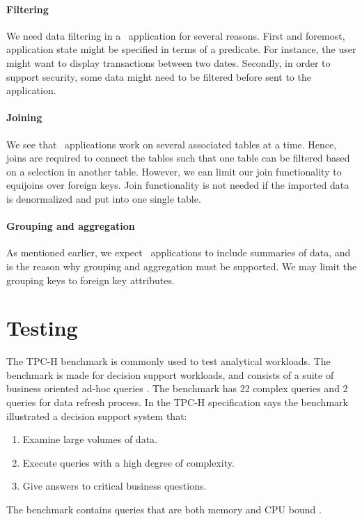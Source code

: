 \paragraph{Filtering}
We need data filtering in a \bd~application for several reasons. First and foremost, application state might be specified in terms of a predicate. For instance, the user might want to display transactions between two dates. Secondly, in order to support security, some data might need to be filtered before sent to the application.

\paragraph{Joining}
We see that \bd~applications work on several associated tables at a time. Hence, joins are required to connect the tables such that one table can be filtered based on a selection in another table. However, we can limit our join functionality to equijoins over foreign keys. Join functionality is not needed if the imported data is denormalized and put into one single table.

\paragraph{Grouping and aggregation}
\label{par:Grouping and aggregation}
As mentioned earlier, we expect \bd~applications to include summaries of data, and is the reason why grouping and aggregation must be supported. We may limit the grouping keys to foreign key attributes.

\section{Testing}
\label{sec:Testing}
The TPC-H benchmark is commonly used to test analytical workloads. The benchmark is made for decision support workloads, and consists of a suite of business oriented ad-hoc queries \cite{Transaction_Processing_Performance_Council_TPC2014-ux}. The benchmark has 22 complex queries and 2 queries for data refresh process. In the TPC-H specification says the benchmark illustrated a decision support system that:
\begin{enumerate}
  \item Examine large volumes of data.
  \item Execute queries with a high degree of complexity.
  \item Give answers to critical business questions.
\end{enumerate}
The benchmark contains queries that are both memory and CPU bound \cite{Boncz2005-wj}. 

